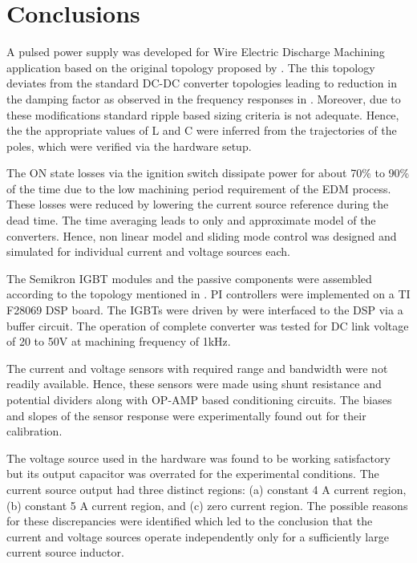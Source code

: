 \section{Conclusions}
\label{conclusions}
	A pulsed power supply was developed for Wire Electric Discharge Machining application based on the original topology proposed by \citet{tastekin2009novel}. The this topology deviates from the standard DC-DC converter topologies leading to reduction in the damping factor as observed in the frequency responses in . Moreover, due to these modifications standard ripple based sizing criteria is not adequate. Hence, the the appropriate values of L and C were inferred from the trajectories of the poles, which were verified via the hardware setup.

	The ON state losses via the ignition switch dissipate power for about 70\% to 90\% of the time due to the low machining period requirement of the EDM process. These losses were reduced by lowering the current source reference during the dead time. The time averaging leads to only and approximate model of the converters. Hence, non linear model and sliding mode control was designed and simulated for individual current and voltage sources each.
	
	The Semikron IGBT modules and the passive components were assembled according to the topology mentioned in .  PI controllers were implemented on a TI F28069 DSP board. The IGBTs were driven by were interfaced to the DSP via a buffer circuit. The operation of complete converter was tested for DC link voltage of 20 to 50V at machining frequency of 1kHz.

	The current and voltage sensors with required range and bandwidth were not readily available. Hence, these sensors were made using shunt resistance and potential dividers along with OP-AMP based conditioning circuits. The biases and slopes of the sensor response were experimentally found out for their calibration.
	
	The voltage source used in the hardware was found to be working satisfactory but its output capacitor was overrated for the experimental conditions. The current source output had three distinct regions: (a) constant 4 A current region, (b) constant 5 A current region, and (c) zero current region. The possible reasons for these discrepancies were identified which led to the conclusion that the current and voltage sources operate independently only for a sufficiently large current source inductor.
 
